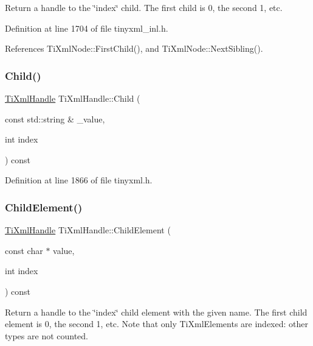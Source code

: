 Return a handle to the \char`\"{}index\char`\"{} child. The first child is 0, the second 1, etc. 

Definition at line 1704 of file tinyxml\+\_\+inl.\+h.



References Ti\+Xml\+Node\+::\+First\+Child(), and Ti\+Xml\+Node\+::\+Next\+Sibling().

\hypertarget{class_ti_xml_handle_abc163863954f3e3cf38d08c0773ce066}{}\label{class_ti_xml_handle_abc163863954f3e3cf38d08c0773ce066} 
\subsubsection{\texorpdfstring{Child()}{Child()}\hspace{0.1cm}{\footnotesize\ttfamily [3/3]}}
{\footnotesize\ttfamily \hyperlink{class_ti_xml_handle}{Ti\+Xml\+Handle} Ti\+Xml\+Handle\+::\+Child (\begin{DoxyParamCaption}\item[{const std\+::string \&}]{\+\_\+value,  }\item[{int}]{index }\end{DoxyParamCaption}) const\hspace{0.3cm}{\ttfamily [inline]}}



Definition at line 1866 of file tinyxml.\+h.

\hypertarget{class_ti_xml_handle_afccc59d8a0daa8c5d78474fbed430ddb}{}\label{class_ti_xml_handle_afccc59d8a0daa8c5d78474fbed430ddb} 
\subsubsection{\texorpdfstring{Child\+Element()}{ChildElement()}\hspace{0.1cm}{\footnotesize\ttfamily [1/3]}}
{\footnotesize\ttfamily \hyperlink{class_ti_xml_handle}{Ti\+Xml\+Handle} Ti\+Xml\+Handle\+::\+Child\+Element (\begin{DoxyParamCaption}\item[{const char $\ast$}]{value,  }\item[{int}]{index }\end{DoxyParamCaption}) const}

Return a handle to the \char`\"{}index\char`\"{} child element with the given name. The first child element is 0, the second 1, etc. Note that only Ti\+Xml\+Elements are indexed\+: other types are not counted. 

